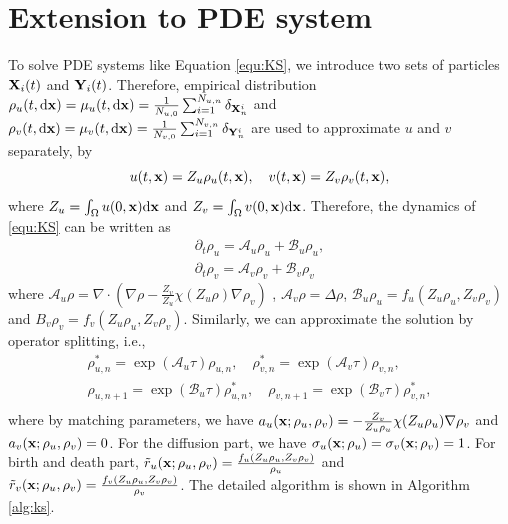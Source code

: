 \documentclass[a4paper,fleqn]{cas-sc}
\theoremstyle{definition}
\theoremstyle{remark}
\begin{document}
\section{Extension to PDE system}
\label{sec:extension}
To solve PDE systems like Equation \eqref{equ:KS}, we introduce two sets of particles $\mathbf{X}_i(t)$ and $\mathbf{Y}_i(t)$. Therefore, empirical distribution $\rho_u(t,\mathrm{d} \mathbf{x} ) = \mu_u(t,\mathrm{d} \mathbf{x}) =  \frac{1}{N_{u,0}}\sum_{i=1}^{N_{u,n}}\delta_{\mathbf{X}_n^i} $ and $\rho_v(t,\mathrm{d} \mathbf{x} ) = \mu_v(t,\mathrm{d} \mathbf{x}) =  \frac{1}{N_{v,0}}\sum_{i=1}^{N_{v,n}}\delta_{\mathbf{Y}_n^i}$ are used to approximate $u$ and $v$ separately, by 
\begin{equation}
    u(t,\mathbf{x}) =  Z_u \rho_u(t,\mathbf{x}), \quad v(t,\mathbf{x}) =  Z_v \rho_v(t,\mathbf{x}),
\end{equation}
where $Z_u = \int_\Omega u(0,\mathbf{x}) \mathrm{d} \mathbf{x}$ and $Z_v = \int_\Omega v(0,\mathbf{x}) \mathrm{d} \mathbf{x}$. Therefore, the dynamics of \eqref{equ:KS} can be written as 
\begin{equation}
    \begin{aligned}
        \partial_t \rho_u =  \mathcal A_u \rho_u + \mathcal B_u \rho_u,\\
        \partial_t \rho_v =  \mathcal A_v \rho_v + \mathcal B_v \rho_v
    \end{aligned}
\end{equation}
where $\mathcal A_u \rho = \nabla \cdot ( \nabla \rho - \frac{Z_v}{Z_u} \chi(Z_u\rho) \nabla \rho_v)$ , $\mathcal A_v \rho = \Delta \rho$, $\mathcal B_u \rho_u  = f_u(Z_u\rho_u,Z_v \rho_v)$ and $B_v \rho_v = f_v(Z_u\rho_u,Z_v \rho_v)$. Similarly, we can approximate the solution by operator splitting, i.e., 
\begin{equation}
    \begin{aligned}
        \rho_{u,n}^*  =  \exp(\mathcal A_u\tau) \rho_{u,n}, \quad 
         \rho_{v,n}^*  =  \exp(\mathcal A_v\tau) \rho_{v,n},  \\
         \rho_{u,n+1} =  \exp(\mathcal B_u\tau) \rho_{u,n}^*,  \quad 
         \rho_{v,n+1}  =  \exp(\mathcal B_v\tau) \rho_{v,n}^*,   \\
    \end{aligned}
\end{equation}
where by matching parameters, we have $a_u(\mathbf{x};\rho_u,\rho_v) =  - \frac{Z_v}{Z_u\rho_u} \chi(Z_u\rho_u) \nabla \rho_v $ and $a_v(\mathbf{x};\rho_u,\rho_v)= 0$. For the diffusion part, we have $\sigma_u(\mathbf{x};\rho_u) = \sigma_v(\mathbf{x};\rho_v) = 1$. For birth and death part, $\tilde r_u (\mathbf{x};\rho_u,\rho_v)=  \frac{f_u(Z_u\rho_u,Z_v \rho_v)}{\rho_u}  $ and $\tilde r_v (\mathbf{x};\rho_u,\rho_v )=  \frac{f_v(Z_u\rho_u,Z_v \rho_v)}{\rho_v}  $. The detailed algorithm is shown in  Algorithm \ref{alg:ks}.
\end{document}
